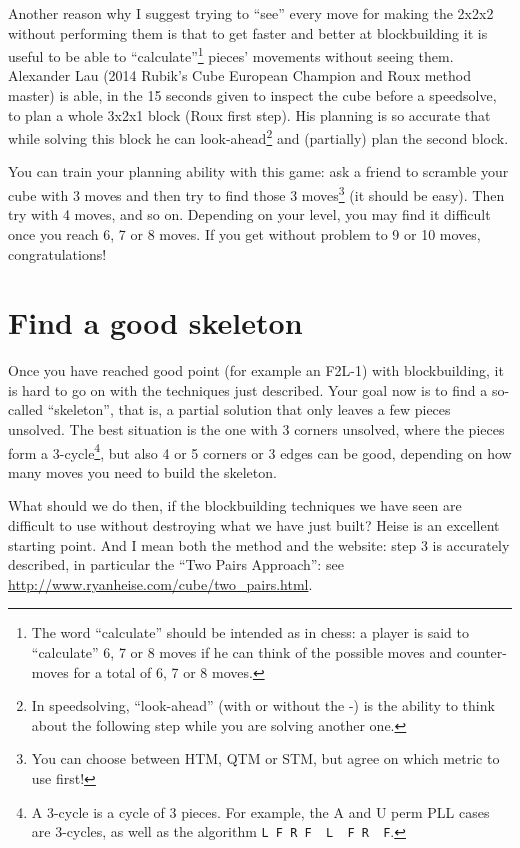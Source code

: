 \documentclass[11pt,a4paper]{book}
\newcommand{\p}{\textquotesingle}
\newcommand{\m}{\texttt}
\newcommand{\ps}{\p\,\,}
\begin{document}
Another reason why I suggest trying to ``see'' every move for making the 2x2x2 without performing them is that to get faster and better at blockbuilding it is useful to be able to ``calculate''\footnote{The word ``calculate'' should be intended as in chess: a player is said to ``calculate'' 6, 7 or 8 moves if he can think of the possible moves and counter-moves for a total of 6, 7 or 8 moves.} pieces' movements without seeing them. Alexander Lau (2014 Rubik's Cube European Champion and Roux method master) is able, in the 15 seconds given to inspect the cube before a speedsolve, to plan a whole 3x2x1 block (Roux first step). His planning is so accurate that while solving this block he can look-ahead\footnote{In speedsolving, ``look-ahead'' (with or without the -) is the ability to think about the following step while you are solving another one.} and (partially) plan the second block.

You can train your planning ability with this game: ask a friend to scramble your cube with 3 moves and then try to find those 3 moves\footnote{You can choose between HTM, QTM or STM, but agree on which metric to use first!} (it should be easy). Then try with 4 moves, and so on. Depending on your level, you may find it difficult once you reach 6, 7 or 8 moves. If you get without problem to 9 or 10 moves, congratulations!

\section{Find a good skeleton}

Once you have reached good point (for example an F2L-1) with blockbuilding, it is hard to go on with the techniques just described. Your goal now is to find a so-called ``skeleton'', that is, a partial solution that only leaves a few pieces unsolved. The best situation is the one with 3 corners unsolved, where the pieces form a 3-cycle\footnote{A 3-cycle is a cycle of 3 pieces. For example, the A and U perm PLL cases are 3-cycles, as well as the algorithm \m{L F R F\ps L\ps F R\ps F\p}.}, but also 4 or 5 corners or 3 edges can be good, depending on how many moves you need to build the skeleton.

What should we do then, if the blockbuilding techniques we have seen are difficult to use without destroying what we have just built? Heise is an excellent starting point. And I mean both the method and the website: step 3 is accurately described, in particular the ``Two Pairs Approach'': see \url{http://www.ryanheise.com/cube/two_pairs.html}.
\end{document}
